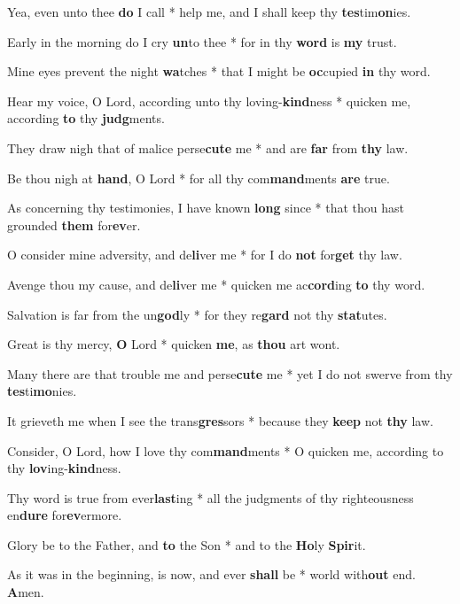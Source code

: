 \begin{multicols}{2}
	Yea, even unto thee \textbf{do} I call * help me, and I shall keep thy \textbf{tes}tim\textbf{on}ies.
	
	Early in the morning do I cry \textbf{un}to thee * for in thy \textbf{word} is \textbf{my} trust.
	
	Mine eyes prevent the night \textbf{wa}tches * that I might be \textbf{oc}cupied \textbf{in} thy word.
	
	Hear my voice, O Lord, according unto thy loving-\textbf{kind}ness * quicken me, according \textbf{to} thy \textbf{judg}ments.
	
	They draw nigh that of malice perse\textbf{cute} me * and are \textbf{far} from \textbf{thy} law.
	
	Be thou nigh at \textbf{hand}, O Lord * for all thy com\textbf{mand}ments \textbf{are} true.
	
	As concerning thy testimonies, I have known \textbf{long} since * that thou hast grounded \textbf{them} for\textbf{ev}er.
	
	O consider mine adversity, and de\textbf{li}ver me * for I do \textbf{not} for\textbf{get} thy law.
	
	Avenge thou my cause, and de\textbf{li}ver me * quicken me ac\textbf{cord}ing \textbf{to} thy word.
	
	Salvation is far from the un\textbf{god}ly * for they re\textbf{gard} not thy \textbf{stat}utes.
	
	Great is thy mercy, \textbf{O} Lord * quicken \textbf{me}, as \textbf{thou} art wont.
	
	Many there are that trouble me and perse\textbf{cute} me * yet I do not swerve from thy \textbf{tes}ti\textbf{mo}nies.
	
	It grieveth me when I see the trans\textbf{gres}sors * because they \textbf{keep} not \textbf{thy} law.
	
	Consider, O Lord, how I love thy com\textbf{mand}ments * O quicken me, according to thy \textbf{lov}ing-\textbf{kind}ness.
	
	Thy word is true from ever\textbf{last}ing * all the judgments of thy righteousness en\textbf{dure} for\textbf{ev}ermore.
	
	Glory be to the Father, and \textbf{to} the Son * and to the \textbf{Ho}ly \textbf{Spir}it.
	
	As it was in the beginning, is now, and ever \textbf{shall} be * world with\textbf{out} end. \textbf{A}men.
\end{multicols}